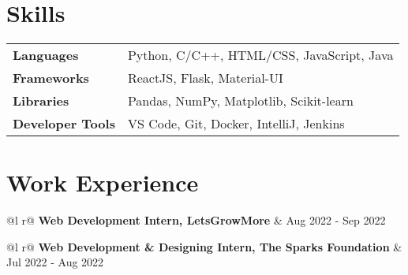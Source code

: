 \documentclass[a4paper,12pt]{article}
\begin{document}
\section{Skills}
\begin{tabularx}{\linewidth}{@{}l X@{}}
\textbf{Languages} &  \normalsize{Python, C/C++, HTML/CSS, JavaScript, Java}\\ [3.75pt]
\textbf{Frameworks}  &  \normalsize{ReactJS, Flask, Material-UI}\\ [3.75pt]
\textbf{Libraries}  &  \normalsize{Pandas, NumPy, Matplotlib, Scikit-learn}\\ [3.75pt]
\textbf{Developer Tools}  &  \normalsize{VS Code, Git, Docker, IntelliJ, Jenkins}\\ 
\end{tabularx}


\section{Work Experience}

\begin{tabularx}{\linewidth}{ @{}l r@{} }
\textbf{Web Development Intern, LetsGrowMore} & \hfill Aug 2022 - Sep 2022 \\[3.75pt]
\end{tabularx}

\begin{tabularx}{\linewidth}{ @{}l r@{} }
\textbf{Web Development \& Designing Intern, The Sparks Foundation} & \hfill Jul 2022 - Aug 2022 \\[3.75pt]
\\
\end{tabularx}
\end{document}
